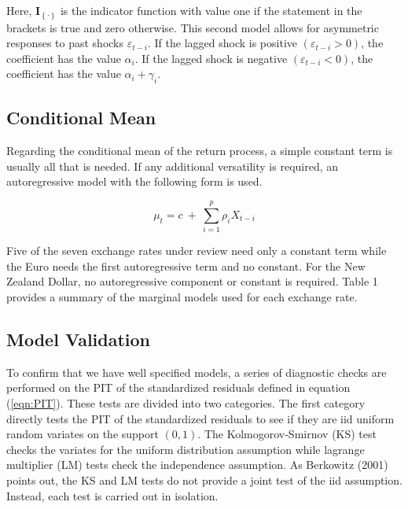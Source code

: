 \documentclass[12pt]{article}
\begin{document}
Here, $\mathbf{I}_{\left\{ \cdot \right\}}$ is the indicator function with value one if the statement in the brackets is true and zero otherwise. This second model allows for asymmetric responses to past shocks $\varepsilon_{t-i}$. If the lagged shock is positive $\left(\varepsilon_{t-i}>0\right)$, the coefficient has the value $\alpha_{i}$. If the lagged shock is negative $\left(\varepsilon_{t-i} < 0 \right)$, the coefficient has the value $\alpha_{i} + \gamma_{i}$.

\subsection{Conditional Mean}

Regarding the conditional mean of the return process, a simple constant term is usually all that is needed. If any additional versatility is required, an autoregressive model with the following form is used.

\begin{equation} \label{eqn:AR}
\mu_{t} = c ~+~ \sum_{i = 1}^{p} \rho_{i} X_{t - i}
\end{equation}

Five of the seven exchange rates under review need only a constant term while the Euro needs the first autoregressive term and no constant. For the New Zealand Dollar, no autoregressive component or constant is required. Table 1 provides a summary of the marginal models used for each exchange rate.

\subsection{Model Validation}

To confirm that we have well specified models, a series of diagnostic checks are performed on the PIT of the standardized residuals defined in equation (\ref{eqn:PIT}). These tests are divided into two categories. The first category directly tests the PIT of the standardized residuals to see if they are iid uniform random variates on the support $\left(0,1\right)$. The Kolmogorov-Smirnov (KS) test checks the variates for the uniform distribution assumption while lagrange multiplier (LM) tests check the independence assumption. As Berkowitz (2001) points out, the KS and LM tests do not provide a joint test of the iid assumption. Instead, each test is carried out in isolation.
\end{document}
